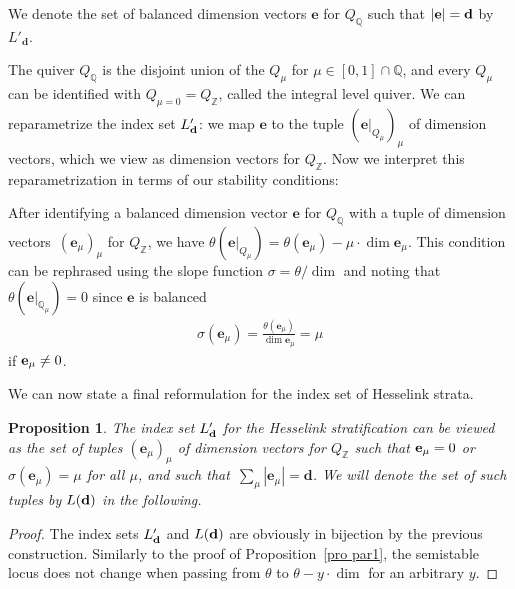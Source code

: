 \documentclass[10pt,a4paper]{amsart}
\numberwithin{equation}{section}
\newtheorem{Proposition}[Theorem]{Proposition}
\theoremstyle{definition}
\begin{document}
We denote the set of balanced dimension vectors $\mathbf{e}$ for ${Q}_{\mathbb{Q}}$ such that $|{\bf e}| = {\bf d}$ by $L'_\mathbf{d}$.

The quiver $Q_\mathbb{Q}$ is the disjoint union of the $Q_\mu$ for $\mu\in[0,1]\cap\mathbb{Q}$, and every $Q_\mu$ can be identified with $Q_{\mu=0}=Q_\mathbb{Z}$, called the integral level quiver. We can reparametrize the index set $L'_{\bf d}$: we map $\mathbf{e}$ to the tuple $(\mathbf{e}|_{Q_\mu})_\mu$ of dimension vectors, which we view as dimension vectors for $Q_\mathbb{Z}$. %
Now we interpret this reparametrization in terms of our stability conditions:

After identifying a balanced dimension vector $\mathbf{e}$ for $Q_{\mathbb{Q}}$ with a tuple of dimension vectors~$(\mathbf{e}_\mu)_\mu$ for $Q_{\mathbb{Z}}$, we have
$
\theta (\mathbf{e}|_{Q_\mu}) = \theta (\mathbf{e}_\mu) -\mu\cdot\dim \mathbf{e}_\mu $.
This condition can be rephrased using the slope function $\sigma=\theta/{\dim}$ and noting that $\theta (\mathbf{e}|_{\mathbb{Q}_{\mu}}) = 0$ since $\mathbf{e}$ is balanced
\begin{align*}
\sigma ( \mathbf{e}_\mu) = \frac{\theta(\mathbf{e}_{\mu})}{\dim \mathbf{e}_\mu} = \mu
\end{align*}
if ${\bf e}_\mu\not=0$.

We can now state a final reformulation for the index set of Hesselink strata.

\begin{Proposition} \label{prop par2}
The index set $L'_{\bf d}$ for the Hesselink stratification can be viewed as the set of tuples $(\mathbf{e}_\mu)_\mu$ of dimension vectors for $Q_\mathbb{Z}$ such that ${\bf e}_\mu=0$ or $\sigma(\mathbf{e}_\mu)%
=\mu$ for all $\mu$, and such that~${\sum_\mu|\mathbf{e}_\mu|=\mathbf{d}}$. We will denote the set of such tuples by $L({\bf d})$ in the following.
\end{Proposition}

\begin{proof}
The index sets $L'_{\bf d}$ and $L({\bf d})$ are obviously in bijection by the previous construction. Similarly to the proof of Proposition~\ref{pro par1}, the semistable locus does not change when passing from $\theta$ to $\theta - y\cdot\dim $ for an arbitrary $y$.
\end{proof}
\end{document}
